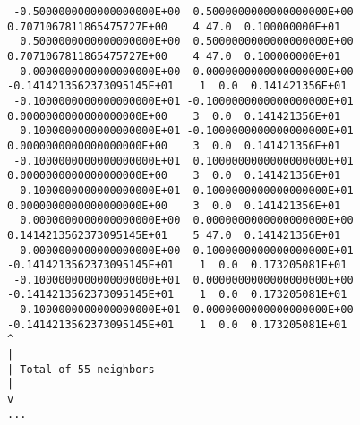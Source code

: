 \documentclass[11pt,fleqn]{book} %
\begin{document}
\begin{VBox}
{{\begin{verbatim}
 -0.5000000000000000000E+00  0.5000000000000000000E+00  0.7071067811865475727E+00    4 47.0  0.100000000E+01
  0.5000000000000000000E+00  0.5000000000000000000E+00  0.7071067811865475727E+00    4 47.0  0.100000000E+01
  0.0000000000000000000E+00  0.0000000000000000000E+00 -0.1414213562373095145E+01    1  0.0  0.141421356E+01
 -0.1000000000000000000E+01 -0.1000000000000000000E+01  0.0000000000000000000E+00    3  0.0  0.141421356E+01
  0.1000000000000000000E+01 -0.1000000000000000000E+01  0.0000000000000000000E+00    3  0.0  0.141421356E+01
 -0.1000000000000000000E+01  0.1000000000000000000E+01  0.0000000000000000000E+00    3  0.0  0.141421356E+01
  0.1000000000000000000E+01  0.1000000000000000000E+01  0.0000000000000000000E+00    3  0.0  0.141421356E+01
  0.0000000000000000000E+00  0.0000000000000000000E+00  0.1414213562373095145E+01    5 47.0  0.141421356E+01
  0.0000000000000000000E+00 -0.1000000000000000000E+01 -0.1414213562373095145E+01    1  0.0  0.173205081E+01
 -0.1000000000000000000E+01  0.0000000000000000000E+00 -0.1414213562373095145E+01    1  0.0  0.173205081E+01
  0.1000000000000000000E+01  0.0000000000000000000E+00 -0.1414213562373095145E+01    1  0.0  0.173205081E+01
^
|
| Total of 55 neighbors
|
v
...
\end{verbatim}
}}
\end{VBox}
\end{document}
